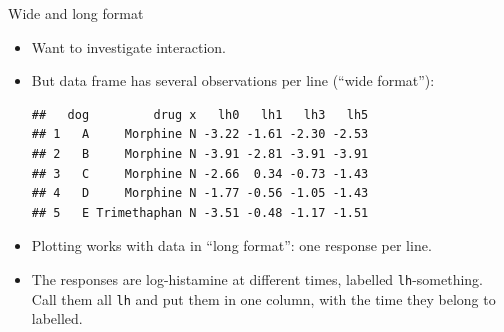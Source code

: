 \begin{frame}[fragile]{Wide and long format}

  \begin{itemize}
  \item Want to investigate interaction.
  \item But data frame has several observations per line (``wide format''):
 
\begin{knitrout}
\color{fgcolor}\begin{kframe}
\begin{alltt}
\hlstd{=}\hlstd{)}
\end{alltt}
\begin{verbatim}
##   dog         drug x   lh0   lh1   lh3   lh5
## 1   A     Morphine N -3.22 -1.61 -2.30 -2.53
## 2   B     Morphine N -3.91 -2.81 -3.91 -3.91
## 3   C     Morphine N -2.66  0.34 -0.73 -1.43
## 4   D     Morphine N -1.77 -0.56 -1.05 -1.43
## 5   E Trimethaphan N -3.51 -0.48 -1.17 -1.51
\end{verbatim}
\end{kframe}
\end{knitrout}
    
  \item Plotting works with data in ``long format'':
    one response per line.
  \item The responses are log-histamine at different times, labelled
    \texttt{lh}-something. Call them all \texttt{lh} and put them in
    one column, with the time they belong to labelled.
  \end{itemize}
  
\end{frame}


